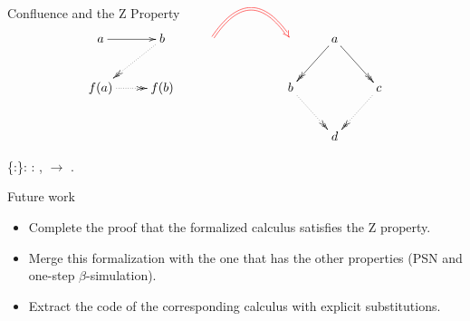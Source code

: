 \documentclass[10pt]{beamer}
\begin{document}
\begin{frame}[fragile]{Confluence and the Z Property}  
  \[
    \xymatrix{
      a \ar[r] &  b \ar@{.>>}[dl] & \ar@/^2.0pc/@{=>}@[red][rr] & &    & a \ar@{->>}[dl] \ar@{->>}[dr] & \\ 
      f(a) \ar@{.>>}[r] & f(b) & & &   b \ar@{.>>}[dr] &  & c \ar@{.>>}[dl] \\
      & & & &       & d & 
            }
  \]
  
  \begin{coqdoccode}
      \{:\}: \coqdockw{\ensuremath{\forall}} :  ,   \ensuremath{\rightarrow}  .\coqdoceol
  \end{coqdoccode}
\end{frame}

\begin{frame}[fragile]{Future work}
  \begin{itemize}
  \item Complete the proof that the formalized calculus satisfies the
    Z property.
  \item Merge this formalization with the one that has the other properties (PSN and one-step $\beta$-simulation).
  \item Extract the code of the corresponding calculus with explicit substitutions.
  \end{itemize}
\end{frame}

% 
% 
\end{document}
